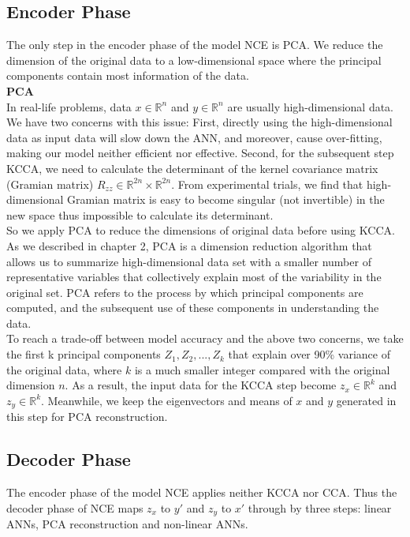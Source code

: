 \documentclass[12pt]{report} %
\begin{document}
\subsection{Encoder Phase}
The only step in the encoder phase of the model NCE is PCA. We reduce the dimension of the original data to a low-dimensional space where the principal components contain most information of the data. \\

\textbf{PCA}\\
In real-life problems, data $x\in \mathbb{R}^{n}$ and $y\in \mathbb{R}^{n}$ are usually high-dimensional data. We have two concerns with this issue: First, directly using the high-dimensional data as input data will slow down the ANN, and moreover, cause over-fitting\cite{STAT}, making our model neither efficient nor effective. Second, for the subsequent step KCCA, we need to calculate the determinant of the kernel covariance matrix (Gramian matrix) $R_{zz} \in \mathbb{R}^{2n} \times \mathbb{R}^{2n}$. From experimental trials, we find that high-dimensional Gramian matrix is easy to become singular (not invertible) in the new space thus impossible to calculate its determinant.\\
So we apply PCA to reduce the dimensions of original data before using KCCA. As we described in chapter 2, PCA is a dimension reduction algorithm that allows us to summarize high-dimensional data set with a smaller number of representative variables that collectively explain most of the variability in the original set. PCA refers to the process by which principal components are computed, and the subsequent use of these components in understanding the data.\\
To reach a trade-off between model accuracy and the above two concerns, we take the first k principal components \(Z_{1}, Z_{2},...,Z_{k}\) that explain over 90\% variance of the original data, where $k$ is a much smaller integer compared with the original dimension $n$. As a result, the input data for the KCCA step become $z_x\in \mathbb{R}^{k}$ and $z_y\in \mathbb{R}^{k}$. Meanwhile, we keep the eigenvectors and means of $x$ and $y$ generated in this step for PCA reconstruction.

\subsection{Decoder Phase}
The encoder phase of the model NCE applies neither KCCA nor CCA. Thus the decoder phase of NCE maps $z_x$ to $y'$ and $z_y$ to $x'$ through by three steps: linear ANNs, PCA reconstruction and non-linear ANNs.\\
\end{document}
